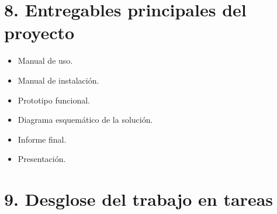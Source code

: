\documentclass[
11pt, %
]{charter}
\begin{document}
\section{8. Entregables principales del proyecto}
\label{sec:entregables}

\begin{itemize}
	\item Manual de uso.
	\item Manual de instalación.
	\item Prototipo funcional.
	\item Diagrama esquemático de la solución.
	\item Informe final.
	\item Presentación.
\end{itemize}

\section{9. Desglose del trabajo en tareas}
\label{sec:wbs}
\end{document}
